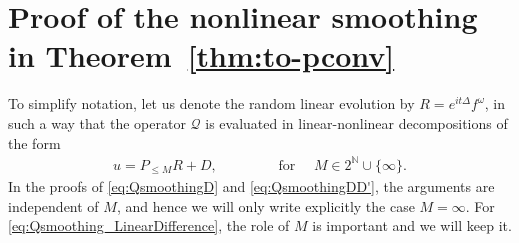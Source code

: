 \documentclass[11pt, xcolor = dvipsnames,reqno
]{amsart}
\theoremstyle{definition}
\theoremstyle{remark}
\begin{document}
\section{Proof of the nonlinear smoothing in Theorem~\ref{thm:to-pconv}}
\label{sec:smoothing}

To simplify notation, let us denote the random linear evolution by $R = e^{it\Delta}f^\omega$, in such a way that the operator $\mathcal Q$ is evaluated in linear-nonlinear decompositions of the form
\begin{align}
    u = P_{\leq M} R + D, \qquad \qquad \text{ for } \quad M \in 2^\mathbb N \cup \{\infty\}. 
\end{align}
In the proofs of \eqref{eq:QsmoothingD} and \eqref{eq:QsmoothingDD'}, the arguments are independent of $M$, and hence we will only write explicitly the case $M = \infty$. 
For \eqref{eq:Qsmoothing_LinearDifference}, the role of $M$ is important and we will keep it. 
\end{document}
